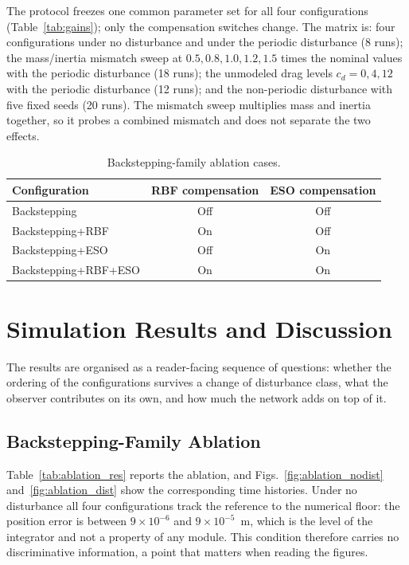 \documentclass[Review,sageh,times]{sagej}
\begin{document}
The protocol freezes one common parameter set for all four configurations
(Table~\ref{tab:gains}); only the compensation switches change. The matrix is:
four configurations under no disturbance and under the periodic disturbance
(8 runs); the mass/inertia mismatch sweep at $0.5,0.8,1.0,1.2,1.5$ times the
nominal values with the periodic disturbance (18 runs); the unmodeled drag
levels $c_d=0,4,12$ with the periodic disturbance (12 runs); and the
non-periodic disturbance with five fixed seeds (20 runs). The mismatch sweep
multiplies mass and inertia together, so it probes a combined mismatch and
does not separate the two effects.

\begin{table}[t]
\centering
\caption{Backstepping-family ablation cases.}
\label{tab:ablation}
\begin{tabular}{@{}lcc@{}}
\hline
Configuration & RBF compensation & ESO compensation\\
\hline
Backstepping & Off & Off\\
Backstepping+RBF & On & Off\\
Backstepping+ESO & Off & On\\
Backstepping+RBF+ESO & On & On\\
\hline
\end{tabular}
\end{table}

\section*{Simulation Results and Discussion}

The results are organised as a reader-facing sequence of questions: whether
the ordering of the configurations survives a change of disturbance class,
what the observer contributes on its own, and how much the network adds on
top of it.

\subsection*{Backstepping-Family Ablation}

Table~\ref{tab:ablation_res} reports the ablation, and
Figs.~\ref{fig:ablation_nodist} and~\ref{fig:ablation_dist} show the corresponding time
histories. Under no disturbance all four configurations track the reference to
the numerical floor: the position error is between $9\times10^{-6}$ and
$9\times10^{-5}$~m, which is the level of the integrator and not a property of
any module. This condition therefore carries no discriminative information, a
point that matters when reading the figures.
\end{document}
